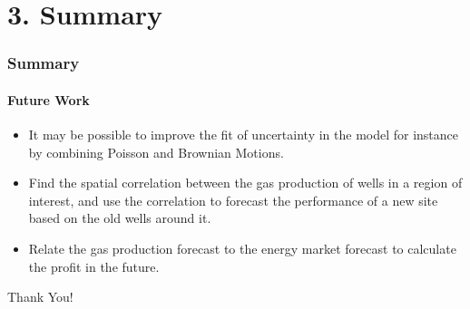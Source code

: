 \documentclass[11pt]{beamer}
\begin{document}
\section{3. Summary}
\begin{frame}
	\frametitle{Summary}
	\framesubtitle{Future Work}
	\justifying
	\begin{itemize}
		\item It may be possible to improve the fit of uncertainty in the model for instance by combining Poisson and Brownian Motions.
		\item Find the spatial correlation between the gas production of wells in a region of interest, and use the correlation to forecast the performance of a new site based on the old wells around it.
		\item Relate the gas production forecast to the energy market forecast to calculate the profit in the future.
	\end{itemize}		
\end{frame}	

\begin{frame}	
	
	\centering
	{\Huge {\Huge Thank You!}}
	
\end{frame}
	
\end{document}
